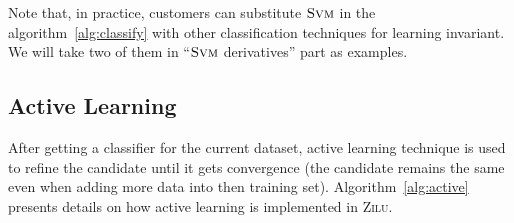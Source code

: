 Note that, in practice, 
customers can substitute $\textsc{Svm}$ in the algorithm~\ref{alg:classify} with other classification techniques for learning invariant. 
We will take two of them in ``$\textsc{Svm}$ derivatives'' part as examples.
 



\subsection{Active Learning} 
After getting a classifier for the current dataset, active learning technique is used to refine the candidate until it gets convergence
(the candidate remains the same even when adding more data into then training set). 
Algorithm~\ref{alg:active} presents details on how active learning is implemented in \textsc{Zilu}. 

